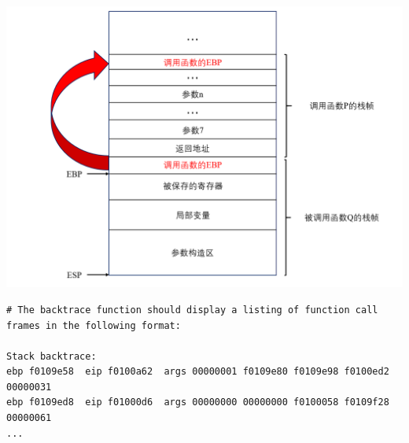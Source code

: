 \documentclass[12pt, letterpaper]{report}
\begin{document}
\includegraphics[width=\textwidth]{StackFrame}

\newpage


\lstset{style=AssemblyStyle}
\setmainfont{Consolas}
\begin{lstlisting}
# The backtrace function should display a listing of function call frames in the following format:

Stack backtrace:
ebp f0109e58  eip f0100a62  args 00000001 f0109e80 f0109e98 f0100ed2 00000031
ebp f0109ed8  eip f01000d6  args 00000000 00000000 f0100058 f0109f28 00000061
...
\end{lstlisting}
\end{document}

